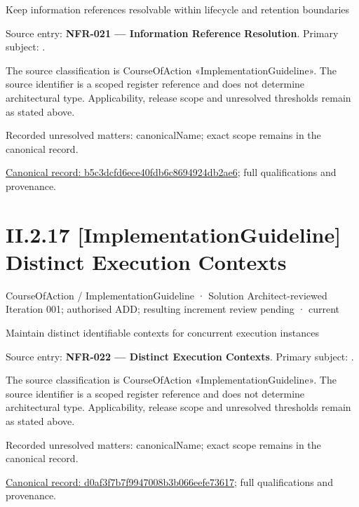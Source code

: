 Keep information references resolvable within lifecycle and retention boundaries



Source entry: \textbf{NFR-021 — Information Reference Resolution}. Primary subject: \texttt{}.



The source classification is CourseOfAction «ImplementationGuideline». The source identifier is a scoped register reference and does not determine architectural type. Applicability, release scope and unresolved thresholds remain as stated above.


{\small Recorded unresolved matters: canonicalName; exact scope remains in the canonical record.}\par
{\footnotesize \href{../../../../../../../continuum/strategy/course-of-action/implementation-guideline/b5c3dcfd6ece40fdb6c8694924db2ae6.md}{Canonical record: b5c3dcfd6ece40fdb6c8694924db2ae6}; full qualifications and provenance.}\par
\section*{II.2.17 [ImplementationGuideline] Distinct Execution Contexts}
\label{navigation:II.2.17}

\label{element:d0af3f7b7f9947008b3b066eefe73617}
{\small CourseOfAction / ImplementationGuideline · Solution Architect-reviewed Iteration 001; authorised ADD; resulting increment review pending · current}\par

Maintain distinct identifiable contexts for concurrent execution instances



Source entry: \textbf{NFR-022 — Distinct Execution Contexts}. Primary subject: \texttt{}.



The source classification is CourseOfAction «ImplementationGuideline». The source identifier is a scoped register reference and does not determine architectural type. Applicability, release scope and unresolved thresholds remain as stated above.


{\small Recorded unresolved matters: canonicalName; exact scope remains in the canonical record.}\par
{\footnotesize \href{../../../../../../../continuum/strategy/course-of-action/implementation-guideline/d0af3f7b7f9947008b3b066eefe73617.md}{Canonical record: d0af3f7b7f9947008b3b066eefe73617}; full qualifications and provenance.}\par
